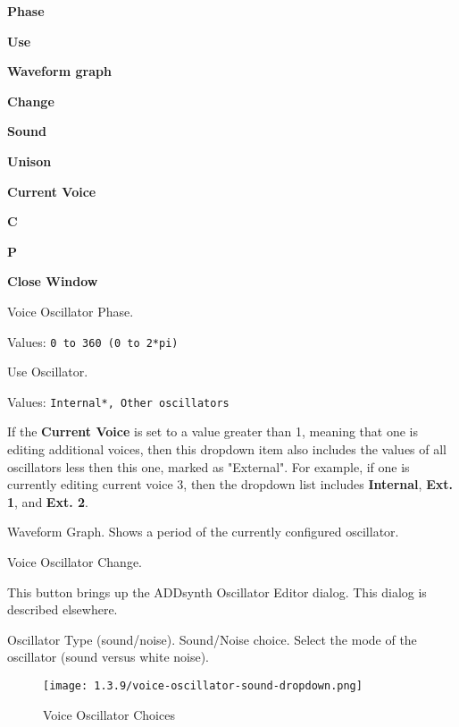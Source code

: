    \begin{enumber}
      \item \textbf{Phase}
      \item \textbf{Use}
      \item \textbf{Waveform graph}
      \item \textbf{Change}
      \item \textbf{Sound}
      \item \textbf{Unison}
      \item \textbf{Current Voice}
      \item \textbf{C}
      \item \textbf{P}
      \item \textbf{Close Window}
   \end{enumber}

   \setcounter{ItemCounter}{0}      %

   Voice Oscillator Phase.

   Values: \texttt{0 to 360 (0 to 2*pi)}

   Use Oscillator.

   Values: \texttt{Internal*, Other oscillators}

   If the \textbf{Current Voice} is set to a value greater than 1, meaning
   that one is editing additional voices, then this dropdown item also
   includes the values of all oscillators less then this one, marked as
   "External".  For example, if one is currently editing current voice 3,
   then the dropdown list includes \textbf{Internal}, \textbf{Ext. 1}, and
   \textbf{Ext. 2}.

   Waveform Graph.
   Shows a period of the currently configured oscillator.

   Voice Oscillator Change.
   
   This button brings up the ADDsynth Oscillator Editor dialog.
   This dialog is described elsewhere.

   Oscillator Type (sound/noise).
   Sound/Noise choice.
   Select the mode of the oscillator (sound versus white noise).

\begin{figure}[H]
   \centering 
   \texttt{[image: 1.3.9/voice-oscillator-sound-dropdown.png]}
   \caption{Voice Oscillator Choices}
   \label{fig:voice_oscillator_choices}
\end{figure}

